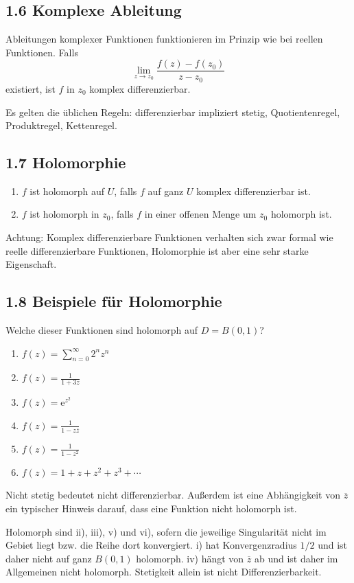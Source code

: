 \documentclass[11pt,a4paper]{article}
\newcommand{\ee}{\mathrm e}
\begin{document}
\subsection{1.6 Komplexe Ableitung}
Ableitungen komplexer Funktionen funktionieren im Prinzip wie bei reellen Funktionen. Falls
\[
\lim_{z\to z_0}\frac{f(z)-f(z_0)}{z-z_0}
\]
existiert, ist $f$ in $z_0$ komplex differenzierbar.

Es gelten die üblichen Regeln: differenzierbar impliziert stetig, Quotientenregel, Produktregel, Kettenregel.

\subsection{1.7 Holomorphie}
\begin{importantbox}
\begin{enumerate}[label=\arabic*.]
\item $f$ ist holomorph auf $U$, falls $f$ auf ganz $U$ komplex differenzierbar ist.
\item $f$ ist holomorph in $z_0$, falls $f$ in einer offenen Menge um $z_0$ holomorph ist.
\end{enumerate}
\end{importantbox}

Achtung: Komplex differenzierbare Funktionen verhalten sich zwar formal wie reelle differenzierbare Funktionen, Holomorphie ist aber eine sehr starke Eigenschaft.

\subsection{1.8 Beispiele für Holomorphie}
\begin{fragebox}
Welche dieser Funktionen sind holomorph auf $D=B(0,1)$?
\begin{enumerate}[label=\roman*)]
\item $f(z)=\sum_{n=0}^{\infty}2^nz^n$
\item $f(z)=\frac{1}{1+3z}$
\item $f(z)=\ee^{z^2}$
\item $f(z)=\frac1{1-z\overline z}$
\item $f(z)=\frac1{1-z^2}$
\item $f(z)=1+z+z^2+z^3+\cdots$
\end{enumerate}
\end{fragebox}
\begin{tippbox}
Nicht stetig bedeutet nicht differenzierbar. Außerdem ist eine Abhängigkeit von $\overline z$ ein typischer Hinweis darauf, dass eine Funktion nicht holomorph ist.
\end{tippbox}
\begin{antwortbox}
Holomorph sind ii), iii), v) und vi), sofern die jeweilige Singularität nicht im Gebiet liegt bzw. die Reihe dort konvergiert. i) hat Konvergenzradius $1/2$ und ist daher nicht auf ganz $B(0,1)$ holomorph. iv) hängt von $\overline z$ ab und ist daher im Allgemeinen nicht holomorph. Stetigkeit allein ist nicht Differenzierbarkeit.
\end{antwortbox}
\end{document}
